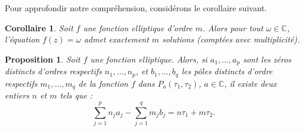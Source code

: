 \documentclass[12pt]{article}
\newtheorem{corollary}{Corollaire}
\newtheorem{proposition}{Proposition}
\begin{document}
        Pour approfondir notre compréhension, considérons le corollaire suivant.
        
        \begin{corollary}
        Soit \( f \) une fonction elliptique d'ordre \( m \). Alors pour tout \( \omega \in \mathbb{C} \), l'équation \( f(z) = \omega \) admet exactement \( m \) solutions (comptées avec multiplicité).
        \end{corollary}
        
        \begin{proposition}
        Soit \( f \) une fonction elliptique. Alors, si \( a_1, \ldots, a_p \) sont les zéros distincts d'ordres respectifs \( n_1, \ldots, n_p \), et \( b_1, \ldots, b_q \) les pôles distincts d'ordre respectifs \( m_1, \ldots, m_q \) de la fonction \( f \) dans \( P_{a}(\tau_1, \tau_2) \), \( a \in \mathbb{C} \), il existe deux entiers \( n \) et \( m \) tels que :
        \[
        \sum_{j=1}^p n_j a_j - \sum_{j=1}^q m_j b_j = n\tau_1 + m\tau_2.
        \]
        \end{proposition}
        
\end{document}
